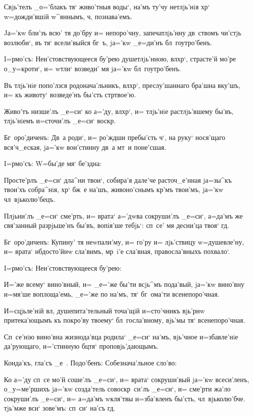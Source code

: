 Свjь'телъ _о='блакъ тя` живо'тныя воды`, на'мъ ту'чу 
нетлjь'нiя хр` w=дожди'вшiй w^яннымъ, ч, 
познава'емъ. 

Jа='кw бли'зъ всю' тя до'бру и= непоро'чну, 
запечатлjь'нну дв~ствомъ чи'стjь возлюби`, въ тя` 
всели'выйся бг~ъ, jа='кw _е=ди'нъ бл~гоутро'бенъ.


I=рмо'съ: Неи'стовствующееся бу'рею душетлjь'нною, 
вл хр`, страсте'й мо'ре о_у=кроти`, и= w\т тли` 
возведи' мя jа='кw бл~гоутро'бенъ.

Въ тлjь'нiе попо'лзся родонача'льникъ, вл хр`, 
преслу'шаннаго бра'шна вку'шъ, и= къ животу` возведе'нъ 
бы'сть стр твое'ю.

Живо'тъ низше'лъ _е=си` ко а='ду, вл хр`, и= 
тлjь'нiе растлjь'вшему бы'въ, тлjь'нiемъ и=сточи'лъ 
_е=си` воскр.

Бг~оро'диченъ: Дв~а роди`, и= ро'ждши пребы'сть 
ч`, на руку` нося'щаго вся'ч_еская, jа='кw вои'стинну 
дв~а мт~и поне'сшая. 

 I=рмо'съ: W=бы'де мя` бе'здна:

Просте'рлъ _е=си` дла^ни твои`, собира'я дале'че 
расточ_е'нная jа=зы^къ твои'хъ собра^нiя, хр` бж~е 
на'шъ, живоно'снымъ кр'мъ твои'мъ, jа='кw 
чл~вjьколю'бецъ.

Плjьни'лъ _е=си` сме'рть, и= врата` а='дwва сокруши'лъ 
_е=си`, а=да'мъ же свя'занный разрjьше'нъ бы'въ, вопiя'ше 
тебjь`: сп~се' мя десни'ца твоя` гд.

Бг~оро'диченъ: Купину' тя неwпали'му, и= го'ру и= 
лjь'ствицу w=душевле'ну, и= врата` нб досто'йнw 
сла'вимъ, мр~i'е сла'вная, правосла'вныхъ похвало`. 

 I=рмо'съ: Неи'стовствующееся бу'рею:

И='же всему` вино'вный, и= _е='же бы'ти всjь^мъ 
пода'вый, jа='кw вино'вну и=мя'ше воплоща'емь, _е='же по 
на'мъ, тя` бг~ома'ти всенепоро'чная.

И=сцjьле'нiй вл, душепита'тельный точа'щiй 
и=сто'чникъ вjь'рнw притека'ющымъ къ покро'ву твоему` 
бл~госла'вному, вjь'мы тя` всенепоро'чная. 

Сп~се'нiю вино'вна жизнода'вца родила` _е=си` на'мъ, 
вjь'чное и=збавле'нiе да'рующаго, и='стинную бц тя` 
проповjь'дающымъ.

Конда'къ, гла'съ _е~. Подо'бенъ: Собезнача'льное 
сло'во:

Ко а='ду сп~се мо'й соше'лъ _е=си`, и= врата` 
сокруши'вый jа='кw всеси'ленъ, о_у=ме'ршихъ jа='кw 
созда'тель совоскр~си'лъ _е=си`, и= сме'рти жа'ло 
сокруши'лъ _е=си`, и= а=да'мъ w\т кля'твы и=зба'вленъ 
бы'сть, чл~вjьколю'бче. тjь'мже вси` зове'мъ: сп~си` 
на'съ гд.


